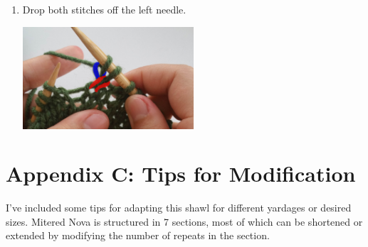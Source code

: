 \documentclass[12pt]{article}
\begin{document}
\begin{multicols}{2}
\begin{enumerate}
\item Drop both stitches off the left needle.

\includegraphics[width=2.5in]{rt_step6.jpg}

\end{enumerate}
\end{multicols}



\newpage
\section*{Appendix C: Tips for Modification}

I've included some tips for adapting this shawl for different yardages or desired sizes. Mitered Nova is structured in 7 sections, most of which can be shortened or extended by modifying the number of repeats in the section.
\end{document}
